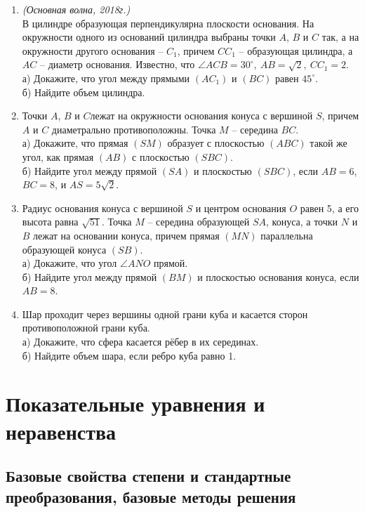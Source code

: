 \documentclass[12pt]{article}
\begin{document}
        \begin{enumerate}[start=1,label={\itshape\bfseries \arabic*.}]
        \item \textit{(Основная волна, 2018г.)}\\
        В цилиндре образующая перпендикулярна плоскости основания. На окружности одного из оснований цилиндра выбраны точки $A$, $B$ и $C$ так, а на окружности другого основания -- $C_1$, причем $C C_1$ -- образующая цилиндра, а $AC$ -- диаметр основания. Известно, что $\angle ACB = 30^{\circ}, \ AB = \sqrt{2}, \ C C_1 = 2$.\\
        а) Докажите, что угол между прямыми $(AC_1)$ и $(BC)$ равен $45^{\circ}$.\\
        б) Найдите объем цилиндра.
        \item Точки $A$, $B$ и $C$лежат на окружности основания конуса с вершиной $S$, причем $A$ и $C$ диаметрально противоположны. Точка $M$ -- середина $BC$.\\
        а) Докажите, что прямая $(SM)$ образует с плоскостью $(ABC)$ такой же угол, как прямая $(AB)$ с плоскостью $(SBC)$.\\
        б) Найдите угол между прямой $(SA)$ и плоскостью $(SBC)$, если $AB = 6$, $BC = 8$, и $AS = 5\sqrt{2}$.
        \item Радиус основания конуса с вершиной $S$ и центром основания $O$ равен 5, а его высота равна $\sqrt{51}$. Точка $M$ -- середина образующей $SA$, конуса, а точки $N$ и $B$ лежат на основании конуса, причем прямая $(MN)$ параллельна образующей конуса $(SB)$.\\
        а) Докажите, что угол $\angle ANO$ прямой. \\
        б) Найдите угол между прямой $(BM)$ и плоскостью основания конуса, если $AB = 8$.
        \item Шар проходит через вершины одной грани куба и касается сторон противоположной грани куба.\\
        а) Докажите, что сфера касается рёбер в их серединах.\\
        б) Найдите объем шара, если ребро куба равно 1.
     \end{enumerate}




\section{Показательные уравнения и неравенства}
\subsection{Базовые свойства степени и стандартные преобразования, базовые методы решения}
\end{document}
